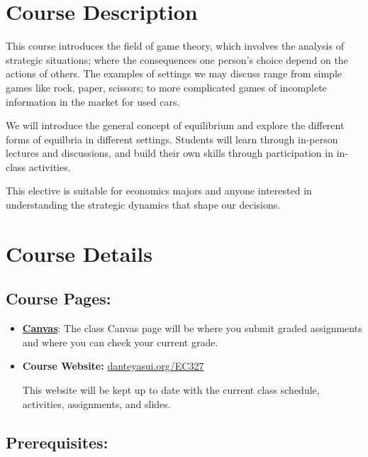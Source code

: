 \section*{Course Description}

This course introduces the field of game theory, which involves the analysis of strategic situations;
where the consequences one person's choice depend on the actions of others.
The examples of settings we may discuss range from simple games like rock, paper, scissors; 
to more complicated games of incomplete information in the market for used cars. 

We will introduce the general concept of equilibrium and explore the different forms of equilbria 
in different settings.
Students will learn through in-person lectures and discussions,
and build their own skills through participation in in-class activities.

This elective is suitable for economics majors and anyone interested in understanding the strategic dynamics that shape our decisions.

\section{Course Details}

\subsection{Course Pages:}

\begin{itemize}

\item \href{https://canvas.uoregon.edu/courses/274671}{\textbf{Canvas}}:
  The class Canvas page will be where you submit graded assignments and where you can check your current grade.

\item \textbf{Course Website:} \href{https://danteyasui.org/EC327/}{danteyasui.org/EC327}

  This website will be kept up to date with the current class schedule, activities, assignments, and slides.

\end{itemize}

\subsection{Prerequisites:}

